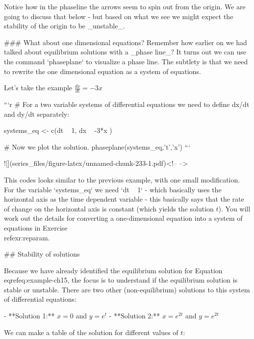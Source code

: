 \documentclass[
]{book}
\theoremstyle{definition}
\theoremstyle{definition}
\theoremstyle{definition}
\theoremstyle{remark}
\begin{document}
Notice how in the phaseline the arrows seem to spin out from the origin. We are going to discuss that below - but based on what we see we might expect the stability of the origin to be _unstable_.  

### What about one dimensional equations?
Remember how earlier on we had talked about equilibrium solutions with a _phase line_?  It turns out we can use the command `phaseplane` to visualize a phase line.  The subtlety is that we need to rewrite the one dimensional equation as a system of equations.

Let's take the example $\displaystyle \frac{dx}{dt} = -3x$


```r
# For a two variable systems of differential equations we need to define dx/dt and dy/dt separately:


systems_eq <- c(dt ~ 1,
                dx ~ -3*x )

# Now we plot the solution. 
phaseplane(systems_eq,'t','x')
```

![](series_files/figure-latex/unnamed-chunk-233-1.pdf)<!-- --> 

This codes looks similar to the previous example, with one small modification.  For the variable `systems_eq` we need `dt ~ 1` - which basically uses the horizontal axis as the time dependent variable - this basically says that the rate of change on the horizontal axis is constant (which yields the solution $t$).  You will work out the details for converting a one-dimensional equation into a system of equations in Exercise \\ref{exr:reparam}.

## Stability of solutions


Because we have already identified the equilibrium solution for Equation \\eqref{eq:example-ch15}, the focus is to understand if the equilibrium solution is stable or unstable.  There are two other (non-equilibrium) solutions to this system of differential equations:

- **Solution 1:** $x=0$ and $y =e^{t}$
- **Solution 2:** $x=e^{2t}$ and $y=e^{2t}$  


We can make a table of the solution for different values of $t$:
\end{document}
